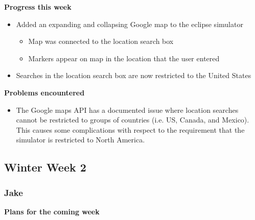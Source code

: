 \documentclass[10pt, onecolumn, draftclsnofoot, letterpaper, compsoc]{IEEEtran}
\begin{document}
    \noindent \textbf{Progress this week}

    \begin{itemize}

    \item Added an expanding and collapsing Google map to the eclipse simulator

    \begin{itemize}
      \item Map was connected to the location search box
      \item Markers appear on map in the location that the user entered
    \end{itemize}

    \item Searches in the location search box are now restricted to the United States

    \end{itemize}

    \noindent \textbf{Problems encountered}

    \begin{itemize}

    \item The Google maps API has a documented issue where location searches cannot be
    restricted to groups of countries (i.e. US, Canada, and Mexico). This causes some
    complications with respect to the requirement that the simulator is restricted to North America.

    \end{itemize}

\subsection{Winter Week 2}

    \subsubsection{Jake}

    \noindent \textbf{Plans for the coming week}
\end{document}
